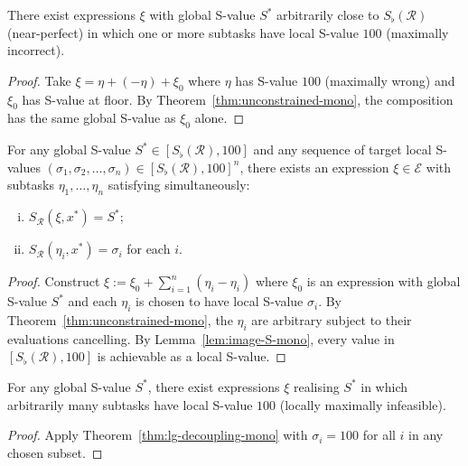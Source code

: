 \begin{corollary}
\label{cor:local-infeas-mono}
There exist expressions $\xi$ with global S-value $S^{*}$ arbitrarily close
to $S_{\flat}(\mathcal{R})$ (near-perfect) in which one or more subtasks
have local S-value $100$ (maximally incorrect).
\end{corollary}

\begin{proof}
Take $\xi = \eta + (-\eta) + \xi_0$ where $\eta$ has S-value $100$ (maximally
wrong) and $\xi_0$ has S-value at floor.  By
Theorem~\ref{thm:unconstrained-mono}, the composition has the same global
S-value as $\xi_0$ alone.
\end{proof}

\begin{theorem}\label{thm:lg-decoupling-mono}
For any global S-value $S^{*} \in [S_{\flat}(\mathcal{R}), 100]$ and any
sequence of target local S-values
$(\sigma_1, \sigma_2, \ldots, \sigma_n) \in [S_{\flat}(\mathcal{R}), 100]^n$,
there exists an expression $\xi \in \mathcal{E}$ with subtasks
$\eta_1, \ldots, \eta_n$ satisfying simultaneously:
\begin{enumerate}[(i)]
  \item $S_{\mathcal{R}}(\xi, x^{*}) = S^{*}$;
  \item $S_{\mathcal{R}}(\eta_i, x^{*}) = \sigma_i$ for each $i$.
\end{enumerate}
\end{theorem}

\begin{proof}
Construct
$\xi := \xi_0 + \sum_{i=1}^{n} (\eta_i - \eta_i)$
where $\xi_0$ is an expression with global S-value $S^{*}$ and each $\eta_i$
is chosen to have local S-value $\sigma_i$.  By
Theorem~\ref{thm:unconstrained-mono}, the $\eta_i$ are arbitrary subject to
their evaluations cancelling.  By Lemma~\ref{lem:image-S-mono}, every value
in $[S_{\flat}(\mathcal{R}), 100]$ is achievable as a local S-value.
\end{proof}

\begin{corollary}\label{cor:miracle-mono}
For any global S-value $S^{*}$, there exist expressions $\xi$ realising
$S^{*}$ in which arbitrarily many subtasks have local S-value $100$
(locally maximally infeasible).
\end{corollary}

\begin{proof}
Apply Theorem~\ref{thm:lg-decoupling-mono} with $\sigma_i = 100$ for all
$i$ in any chosen subset.
\end{proof}

